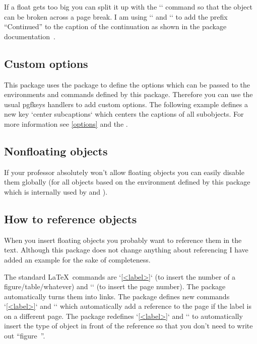 If a float gets too big you can split it up with the `\splitobject` command so that the object can be broken across a page break.
I am using `\DeclareCaptionLabelFormat` and `\captionsetup` to add the prefix \enquote{Continued} to the caption of the continuation as shown in the package  documentation~\autocite[section~3.3
Continued floats]{caption}.



\subsection{Custom options}
\label{custom-options}
This package uses the  package to define the options which can be passed to the environments and commands defined by this package.
Therefore you can use the usual pgfkeys handlers to add custom options.
The following example defines a new key `center subcaptions` which centers the captions of all subobjects.
For more information see \cref{options} and the .



\subsection{Nonfloating objects}
\label{nonfloating-objects}
If your professor absolutely won't allow floating objects you can easily disable them globally
(for all objects based on the  environment defined by this package which is internally used by  and ).

\begin{examplecode}
\end{examplecode}


\subsection{How to reference objects}
\label{vref}
When you insert floating objects you probably want to reference them in the text.
Although this package does not change anything about referencing I have added an example for the sake of completeness.

The standard \LaTeX\ commands are `\ref{<label>}` (to insert the number of a figure/table/whatever) and `\pageref{<label>}` (to insert the page number).
The  package automatically turns them into links.
The  package defines new commands `\vref{<label>}` and `` which automatically add a reference to the page if the label is on a different page.
The  package redefines `\vref{<label>}` and `` to automatically insert the type of object in front of the reference so that you don't need to write out \enquote{figure\string~}.

